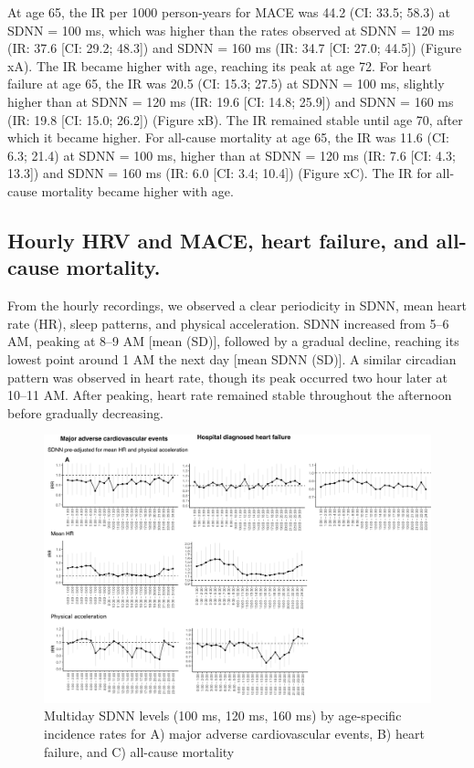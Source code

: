 \documentclass[
  a4paper,
  headsepline=true,
  open=any]{scrbook}
\begin{document}
At age 65, the IR per 1000 person-years for MACE was 44.2 (CI: 33.5;
58.3) at SDNN = 100 ms, which was higher than the rates observed at SDNN
= 120 ms (IR: 37.6 {[}CI: 29.2; 48.3{]}) and SDNN = 160 ms (IR: 34.7
{[}CI: 27.0; 44.5{]}) (Figure xA). The IR became higher with age,
reaching its peak at age 72. For heart failure at age 65, the IR was
20.5 (CI: 15.3; 27.5) at SDNN = 100 ms, slightly higher than at SDNN =
120 ms (IR: 19.6 {[}CI: 14.8; 25.9{]}) and SDNN = 160 ms (IR: 19.8
{[}CI: 15.0; 26.2{]}) (Figure xB). The IR remained stable until age 70,
after which it became higher. For all-cause mortality at age 65, the IR
was 11.6 (CI: 6.3; 21.4) at SDNN = 100 ms, higher than at SDNN = 120 ms
(IR: 7.6 {[}CI: 4.3; 13.3{]}) and SDNN = 160 ms (IR: 6.0 {[}CI: 3.4;
10.4{]}) (Figure xC). The IR for all-cause mortality became higher with
age.

\hypertarget{hourly-hrv-and-mace-heart-failure-and-all-cause-mortality.}{%
\subsection{Hourly HRV and MACE, heart failure, and all-cause
mortality.}\label{hourly-hrv-and-mace-heart-failure-and-all-cause-mortality.}}

From the hourly recordings, we observed a clear periodicity in SDNN,
mean heart rate (HR), sleep patterns, and physical acceleration. SDNN
increased from 5--6 AM, peaking at 8--9 AM {[}mean (SD){]}, followed by
a gradual decline, reaching its lowest point around 1 AM the next day
{[}mean SDNN (SD){]}. A similar circadian pattern was observed in heart
rate, though its peak occurred two hour later at 10--11 AM. After
peaking, heart rate remained stable throughout the afternoon before
gradually decreasing.

\begin{figure}

{\centering \includegraphics[width=10in,height=\textheight]{images/figure_ADD_PRO_risk_by_hour.png}

}

\caption{Multiday SDNN levels (100 ms, 120 ms, 160 ms) by age-specific
incidence rates for A) major adverse cardiovascular events, B) heart
failure, and C) all-cause mortality}

\end{figure}
\end{document}
